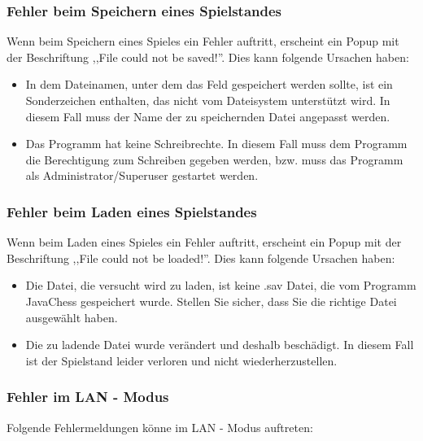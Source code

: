 \documentclass[12pt,a4paper]{article}
\begin{document}
 \subsubsection{Fehler beim Speichern eines Spielstandes}
 
Wenn beim Speichern eines Spieles ein Fehler auftritt, erscheint ein Popup mit der Beschriftung ,,File could not be saved!''. Dies kann folgende Ursachen haben:
\begin{itemize}

\item{In dem Dateinamen, unter dem das Feld gespeichert werden sollte, ist ein Sonderzeichen enthalten, das nicht vom Dateisystem unterstützt wird. In diesem Fall muss der Name der zu speichernden Datei angepasst werden. }

\item{Das Programm hat keine Schreibrechte. In diesem Fall muss dem Programm die Berechtigung zum Schreiben gegeben werden, bzw. muss das Programm als Administrator/Superuser gestartet werden. }

\end{itemize}

	\subsubsection{Fehler beim Laden eines Spielstandes}

Wenn beim Laden eines Spieles ein Fehler auftritt, erscheint ein Popup mit der Beschriftung ,,File could not be loaded!''. Dies kann folgende Ursachen haben:

\begin{itemize}

\item{Die Datei, die versucht wird zu laden, ist keine .sav Datei, die vom Programm JavaChess gespeichert wurde. Stellen Sie sicher, dass Sie die richtige Datei ausgewählt haben. }

\item{Die zu ladende Datei wurde verändert und deshalb beschädigt. In diesem Fall ist der Spielstand leider verloren und nicht wiederherzustellen.}


\end{itemize}

	\subsubsection{Fehler im LAN - Modus}
Folgende Fehlermeldungen könne im LAN - Modus auftreten:
\end{document}
